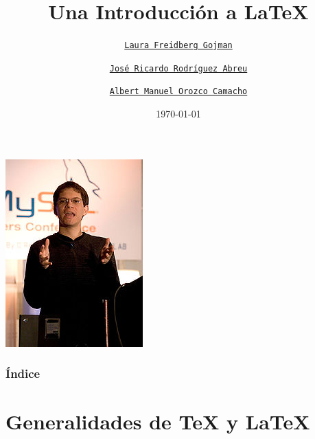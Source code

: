 \documentclass{beamer} %
\title[Introducción \LaTeX]{Una Introducción a \LaTeX}
\author[Freidberg, Rodríguez, Orozco]{
  \small 
  \texttt{\href{mailto:lfreidberg@yahoo.com}{Laura Freidberg Gojman}}
  \and
  \texttt{\href{mailto:ricardo_rodab@ciencias.unam.mx}{José Ricardo Rodríguez Abreu}}
  \and
  \texttt{\href{mailto:alorozco53@ciencias.unam.mx}{Albert Manuel Orozco Camacho}}
}
\date{\today}
\begin{document}
\begin{frame}
  \titlepage
  \centering \includegraphics[scale=1]{cscientist}
\end{frame}

\begin{frame}
  \frametitle{Índice}
  \tableofcontents
\end{frame}

\section{Generalidades de \TeX{} y \LaTeX}
\end{document}

